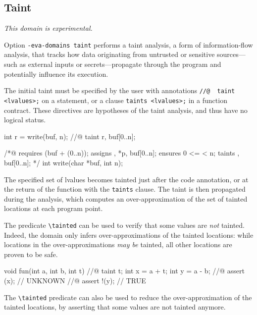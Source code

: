 \documentclass{frama-c-book}
\begin{document}
\subsection{Taint}
\label{sec:taint}

\emph{This domain is experimental.}

Option \texttt{-eva-domains taint} performs a taint analysis, a form of
information-flow analysis, that tracks how data originating from untrusted or
sensitive sources---such as external inputs or secrets---propagate through the
program and potentially influence its execution.

The initial taint must be specified by the user with \acsl{} annotations
\lstinline|//@  taint <lvalues>;| on a statement, or a clause
\lstinline|taints <lvalues>;| in a function contract.
These directives are hypotheses of the taint analysis, and thus have no logical
status.

\begin{listing-nonumber}
  int r = write(buf, n);
  //@ taint r, buf[0..n];
\end{listing-nonumber}

\begin{listing-nonumber}
  /*@ requires \valid(buf + (0..n));
      assigns \result, *p, buf[0..n];
      ensures 0 <= \result < n;
      taints \result, buf[0..n]; */
      int write(char *buf, int n);
\end{listing-nonumber}

The specified set of lvalues becomes tainted just after the code annotation, or
at the return of the function with the \texttt{taints} clause. The taint is then
propagated during the \Eva{} analysis, which computes an over-approximation of
the set of tainted locations at each program point.

The \acsl{} predicate \lstinline|\tainted| can be used to verify that some
values are \emph{not} tainted.
Indeed, the domain only infers over-approximations of the tainted locations:
while locations in the over-approximations \emph{may be} tainted,
all other locations are proven to be safe.

\begin{listing-nonumber}
  void fun(int a, int b, int t) {
    //@ taint t;
    int x = a + t;
    int y = a - b;
    //@ assert \tainted(x);   // UNKNOWN
    //@ assert !\tainted(y);  // TRUE
  }
\end{listing-nonumber}

The \lstinline|\tainted| predicate can also be used to reduce the
over-approximation of the tainted locations, by asserting that some values are
not tainted anymore.
\end{document}
